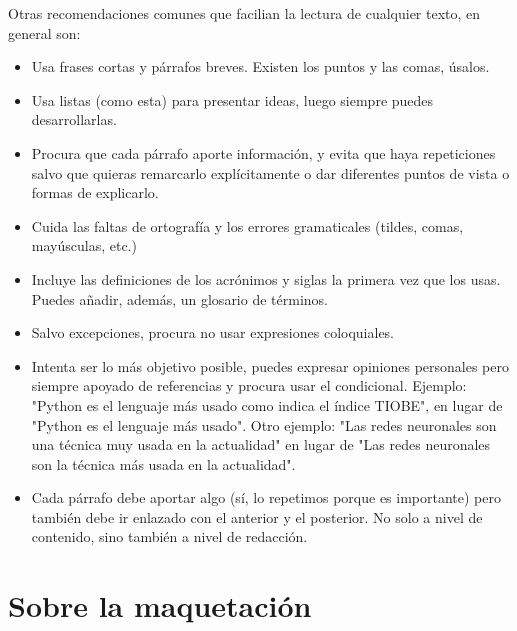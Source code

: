 {Otras recomendaciones comunes que facilian la lectura de cualquier texto, en general son:
\begin{itemize}
    \item Usa frases cortas y párrafos breves. Existen los puntos y las comas, úsalos.
    \item Usa listas (como esta) para presentar ideas, luego siempre puedes desarrollarlas.
    \item Procura que cada párrafo aporte información, y evita que haya repeticiones salvo que quieras remarcarlo explícitamente o dar diferentes puntos de vista o formas de explicarlo.  
    \item Cuida las faltas de ortografía y los errores gramaticales (tildes, comas, mayúsculas, etc.)
    \item Incluye las definiciones de los acrónimos y siglas la primera vez que los usas. Puedes añadir, además, un glosario de términos.
    \item Salvo excepciones, procura no usar expresiones coloquiales.
    \item Intenta ser lo más objetivo posible, puedes expresar opiniones personales pero siempre apoyado de referencias y procura usar el condicional. Ejemplo: "Python es el lenguaje más usado como indica el índice TIOBE", en lugar de "Python es el lenguaje más usado". Otro ejemplo: "Las redes neuronales son una técnica muy usada en la actualidad" en lugar de "Las redes neuronales son la técnica más usada en la actualidad".
    \item Cada párrafo debe aportar algo (sí, lo repetimos porque es importante) pero también debe ir enlazado con el anterior y el posterior. No solo a nivel de contenido, sino también a nivel de redacción.
\end{itemize}



\section{Sobre la maquetación}  %




}
